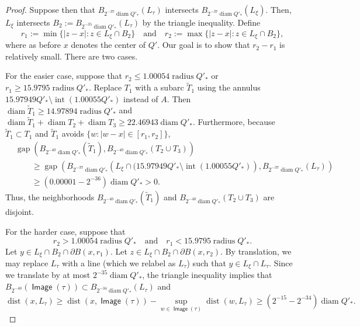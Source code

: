 \documentclass[12pt]{amsart}
\numberwithin{equation}{section}
\theoremstyle{plain}
\theoremstyle{definition}
\newcommand{\radius}{\mathop\mathrm{radius}\nolimits}
\newcommand{\diam}{\mathop\mathrm{diam}\nolimits}
\newcommand{\dist}{\mathop\mathrm{dist}\nolimits}
\newcommand{\Image}{\mathop\mathsf{Image}\nolimits}
\newcommand{\gap}{\mathop\mathrm{gap}\nolimits}
\newcommand{\interior}{\mathop\mathrm{int}\nolimits}
\numberwithin{figure}{section}
\begin{document}
\begin{proof}
Suppose then that $B_{2^{-37}\diam Q'_*}(L_{\tau})$ intersects $B_{2^{-37}\diam Q'_*}(L_{\xi})$. Then, $L_\xi$ intersects $B_2:=B_{2^{-35}\diam Q'_*}(L_\tau)$ by the triangle inequality. Define $$r_1:=\min\{|z-x|: z\in L_\xi \cap B_2\}\quad\text{and}\quad r_2:=\max\{|z-x|:z\in L_\xi \cap B_2\},$$ where as before $x$ denotes the center of $Q'$. Our goal is to show that $r_2-r_1$ is relatively small. There are two cases.

For the easier case, suppose that $r_2\leq 1.00054\radius Q'_*$ or $r_1\geq 15.9795\radius Q'_*$. Replace $T_1$ with a subarc $\tilde T_1$ using the annulus $15.97949Q'_*\setminus\interior(1.00055 Q'_*)$ instead of $A$. Then $\diam \tilde T_1\geq 14.97894\radius Q'_*$ and $\diam \tilde T_1+\diam T_2+\diam T_3\geq 22.46943\diam Q'_*$. Furthermore, because $\tilde T_1\subset T_1$ and $\tilde T_1$ avoids $\{w:|w-x|\in [r_1,r_2]\}$,
\begin{align*}
    &\gap(B_{2^{-40}\diam Q'_*}(\tilde T_1), B_{2^{-40}\diam Q'_*}(T_2 \cup T_3))\\
    &\qquad \ge \gap(B_{2^{-37}\diam Q'_*}\left(L_{\xi}\cap (15.97949Q'_*\setminus\interior(1.00055 Q'_*)\right), B_{2^{-37}\diam Q'_*}(L_{\tau}))\\
    &\qquad \geq (0.00001- 2^{-36})\diam Q'_*>0.
\end{align*}
Thus, the neighborhoods $B_{2^{-40}\diam Q'_*}(\tilde T_1)$ and $B_{2^{-40}\diam Q'_*}(T_2 \cup T_3)$ are disjoint.

For the harder case, suppose that \begin{equation}\label{hard-r} r_2> 1.00054\radius Q'_*\quad\text{and}\quad r_1<15.9795\radius Q'_*.\end{equation} Let $y\in L_\xi \cap B_2\cap \partial B(x,r_1).$ Let $z \in L_\xi \cap B_2 \cap\partial B(x,r_2).$  By translation, we may replace $L_\tau$ with a line (which we relabel as $L_\tau$) such that $y\in L_\xi\cap L_\tau$.  Since we translate by at most $2^{-35}\diam Q'_*$, the triangle inequality implies that $B_{2^{-40}}(\Image(\tau)) \subset B_{2^{-34}\diam Q'_*}(L_{\tau})$ and $$\dist(x,L_\tau)\geq \dist(x,\Image(\tau))-\sup_{w\in \Image(\tau)}\dist(w,L_\tau)\geq (2^{-15}-2^{-34})\diam Q'_*.$$


\end{proof}
\end{document}
